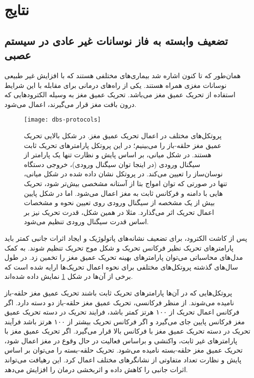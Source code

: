 \section{نتایج }
\subsection{تضعیف وابسته به فاز نوسانات غیر عادی در سیستم عصبی}
همان‌طور که تا کنون اشاره شد بیماری‌های مختلفی هستند که با افزایش غیر طبیعی نوسانات مغزی همراه هستند. 
 یکی از راه‌های درمانی برای مقابله با این شرایط استفاده از تحریک عمیق مغز می‌باشد. تحریک عمیق مغز به وسیله الکترودهایی که درون بافت مغز قرار می‌گیرند، اعمال می‌شود.

\begin{figure}
	\centering
	\texttt{[image: dbs-protocols]}
    \caption{
    پروتکل‌های مختلف در اعمال تحریک عمیق مغز.
در شکل بالایی تحریک عمیق مغز حلقه-باز را می‌بینیم؛ در این پروتکل پارامترهای تحریک ثابت هستند. 
در شکل میانی، بر اساس پایش و نظارت تنها یک پارامتر از سیگنال ورودی (در اینجا توان سیگنال ورودی)، خروجی دستگاه نوسان‌ساز را تعیین می‌کند. در پروتکل نشان داده شده در شکل میانی، تنها در صورتی که توان امواج بتا از آستانه مشخصی بیش‌تر شود، تحریک هایی با دامنه و فرکانس ثابت به مغز اعمال می‌شود. اما در شکل پایین بیش از یک مشخصه از سیگنال ورودی روی تعیین نحوه و مشخصات اعمال تحریک اثر می‌گذارد. مثلا در همین شکل، قدرت تحریک نیز بر اساس قدرت سیگنال ورودی تنظیم می‌شود.
    }
    \label{fig:dbs-protocols}
\end{figure}


پس از کاشت الکترود، برای تضعیف نشانه‌های پاتولوژیک و ایجاد اثرات جانبی کمتر باید پارامترهای تحریک نظیر فرکانس تحریک و شکل موج تحریک تنظیم شوند. به کمک مدل‌های محاسباتی می‌توان پارامترهای بهینه تحریک عمیق مغز را تخمین زد. در طول سال‌های گذشته پروتکل‌های مختلفی برای نحوه اعمال تحریک‌ها ارایه شده است که برخی از آن‌ها در شکل
\ref{fig:dbs-protocols}
نمایش داده شده‌اند. 

پروتکل‌هایی که در آن‌ها پارامترهای تحریک ثابت باشند تحریک عمیق مغز حلقه-باز نامیده می‌شوند.
 از منظر فرکانسی، تحریک عمیق مغز حلقه-باز دو دسته دارد. اگر فرکانس اعمال تحریک از ۱۰۰ هرتز کمتر باشد، فرایند تحریک در دسته تحریک عمیق مغز فرکانس پایین جای می‌گیرد و اگر فرکانس تحریک بیشتر از ۱۰۰ هرتز باشد فرآیند تحریک در دسته تحریک عمیق مغز با فرکانس بالا قرار می‌گیرد. اگر تحریک عمیق مغز با پارامتر‌های غیر ثابت، واکنشی و براساس فعالیت در حال وقوع در مغز اعمال شود، تحریک عمیق مغز حلقه-بسته نامیده می‌شود. تحریک حلقه-بسته را می‌توان بر اساس  پایش و نظارت تعداد متفاوتی از نشانگرهای مختلف اعمال کرد. این رهیافت می‌تواند اثرات جانبی را کاهش داده و اثربخشی درمان را افزایش می‌دهد.
 
